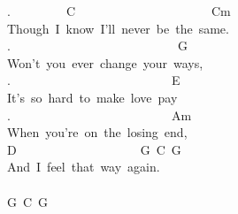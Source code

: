{.\ \ \ \ \ \ \ \ \ C\ \ \ \ \ \ \ \ \ \ \ \ \ \ \ \ \ \ \ \ \ \ Cm\\
Though\ I\ know\ I'll\ never\ be\ the\ same.\\
.\ \ \ \ \ \ \ \ \ \ \ \ \ \ \ \ \ \ \ \ \ \ \ \ \ \ \ G\\
Won't\ you\ ever\ change\ your\ ways,\\
.\ \ \ \ \ \ \ \ \ \ \ \ \ \ \ \ \ \ \ \ \ \ \ \ \ \ E\\
It's\ so\ hard\ to\ make\ love\ pay\\
.\ \ \ \ \ \ \ \ \ \ \ \ \ \ \ \ \ \ \ \ \ \ \ \ \ \ Am\\
When\ you're\ on\ the\ losing\ end,\\
D\ \ \ \ \ \ \ \ \ \ \ \ \ \ \ \ \ \ \ \ G\ C\ G\\
And\ I\ feel\ that\ way\ again.\\
\\
G\ C\ G}
